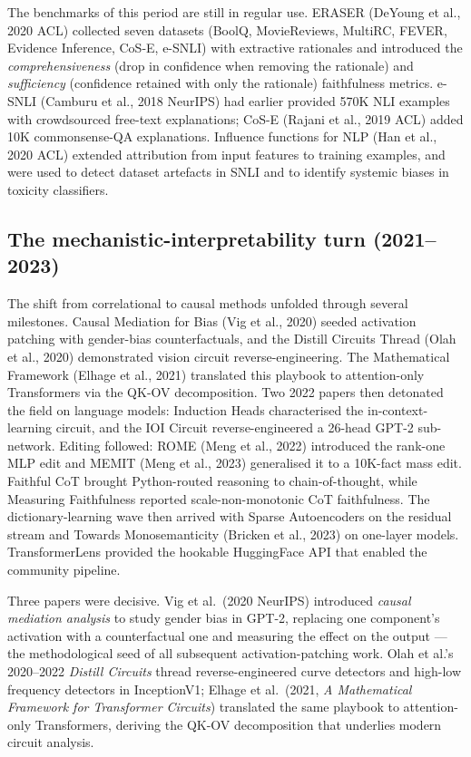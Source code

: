 \documentclass{article}
\begin{document}
The benchmarks of this period are still in regular use. ERASER (DeYoung et al., 2020 ACL) collected seven datasets (BoolQ, MovieReviews, MultiRC, FEVER, Evidence Inference, CoS-E, e-SNLI) with extractive rationales and introduced the \emph{comprehensiveness} (drop in confidence when removing the rationale) and \emph{sufficiency} (confidence retained with only the rationale) faithfulness metrics. e-SNLI (Camburu et al., 2018 NeurIPS) had earlier provided 570K NLI examples with crowdsourced free-text explanations; CoS-E (Rajani et al., 2019 ACL) added 10K commonsense-QA explanations. Influence functions for NLP (Han et al., 2020 ACL) extended attribution from input features to training examples, and were used to detect dataset artefacts in SNLI and to identify systemic biases in toxicity classifiers.

\subsection{The mechanistic-interpretability turn (2021--2023)}\label{the-mechanistic-interpretability-turn-20212023}

The shift from correlational to causal methods unfolded through several milestones. Causal Mediation for Bias (Vig et al., 2020) seeded activation patching with gender-bias counterfactuals, and the Distill Circuits Thread (Olah et al., 2020) demonstrated vision circuit reverse-engineering. The Mathematical Framework (Elhage et al., 2021) translated this playbook to attention-only Transformers via the QK-OV decomposition. Two 2022 papers then detonated the field on language models: Induction Heads \citep{olsson2022incontextlearninga} characterised the in-context-learning circuit, and the IOI Circuit \citep{wang2022interpretabilityin} reverse-engineered a 26-head GPT-2 sub-network. Editing followed: ROME (Meng et al., 2022) introduced the rank-one MLP edit and MEMIT (Meng et al., 2023) generalised it to a 10K-fact mass edit. Faithful CoT \citep{lyu2023faithfulchainoftho} brought Python-routed reasoning to chain-of-thought, while Measuring Faithfulness \citep{lanham2023measuringfaithfuln} reported scale-non-monotonic CoT faithfulness. The dictionary-learning wave then arrived with Sparse Autoencoders \citep{cunningham2023sparseautoencoders} on the residual stream and Towards Monosemanticity (Bricken et al., 2023) on one-layer models. TransformerLens \citep{nanda2023progressmeasuresfo} provided the hookable HuggingFace API that enabled the community pipeline.

Three papers were decisive. Vig et al.~(2020 NeurIPS) introduced \emph{causal mediation analysis} to study gender bias in GPT-2, replacing one component's activation with a counterfactual one and measuring the effect on the output --- the methodological seed of all subsequent activation-patching work. Olah et al.'s 2020--2022 \emph{Distill Circuits} thread reverse-engineered curve detectors and high-low frequency detectors in InceptionV1; Elhage et al.~(2021, \emph{A Mathematical Framework for Transformer Circuits}) translated the same playbook to attention-only Transformers, deriving the QK-OV decomposition that underlies modern circuit analysis.
\end{document}
